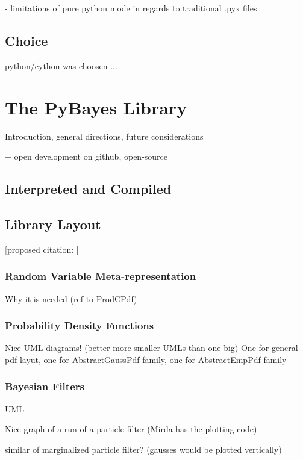 \documentclass[a4paper,12pt,oneside]{report}
\begin{document}
		- limitations of pure python mode in regards to traditional .pyx files

\section{Choice}

python/cython was choosen ...


\chapter{The PyBayes Library}

Introduction, general directions, future considerations

+ open development on github, open-source

\section{Interpreted and Compiled}

\section{Library Layout}

[proposed citation: \cite{Smi:05}]

\subsection{Random Variable Meta-representation}

Why it is needed (ref to ProdCPdf)

\subsection{Probability Density Functions}

Nice UML diagrams! (better more smaller UMLs than one big) One for general pdf layut, one for
AbstractGaussPdf family, one for AbstractEmpPdf family

\subsection{Bayesian Filters}

UML

Nice graph of a run of a particle filter (Mirda has the plotting code)

similar of marginalized particle filter? (gausses would be plotted vertically)
\end{document}
